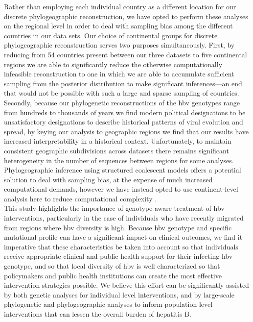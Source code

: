 Rather than employing each individual country as a different location for our discrete phylogeographic reconstruction, we have opted to perform these analyses on the regional level in order to deal with sampling bias among the different countries in our data sets.
Our choice of continental groups for discrete phylogeographic reconstruction serves two purposes simultaneously.
First, by reducing from 54 countries present between our three datasets to five continental regions we are able to significantly reduce the otherwise computationally infeasible reconstruction to one in which we are able to accumulate sufficient sampling from the posterior distribution to make significant inferences---an end that would not be possible with such a large and sparse sampling of countries.
Secondly, because our phylogenetic reconstructions of the \gls{hbv} genotypes range from hundreds to thousands of years we find modern political designations to be unsatisfactory designations to describe historical patterns of viral evolution and spread, by keying our analysis to geographic regions we find that our results have increased interpretability in a historical context.
Unfortunately, to maintain consistent geographic subdivisions across datasets there remains significant heterogeneity in the number of sequences between regions for some analyses.
Phylogeographic inference using structured coalescent models \citep{maio_new_2015,muller2018mascot} offers a potential solution to deal with sampling bias, at the expense of much increased computational demands, however we have instead opted to use continent-level analysis here to reduce computational complexity \citep{hong_search_2020}.\\

This study highlights the importance of genotype-aware treatment of \gls{hbv} interventions, particularly in the case of individuals who have recently migrated from regions where \gls{hbv} diversity is high.
Because \gls{hbv} genotype and specific mutational profile can have a significant impact on clinical outcomes, we find it imperative that these characteristics be taken into account so that individuals receive appropriate clinical and public health support for their infecting \gls{hbv} genotype, and so that local diversity of \gls{hbv} is well characterized so that policymakers and public health institutions can create the most effective intervention strategies possible.
We believe this effort can be significantly assisted by both genetic analyses for individual level interventions, and by large-scale phylogenetic and phylogeographic analyses to inform population level interventions that can lessen the overall burden of hepatitis B.



